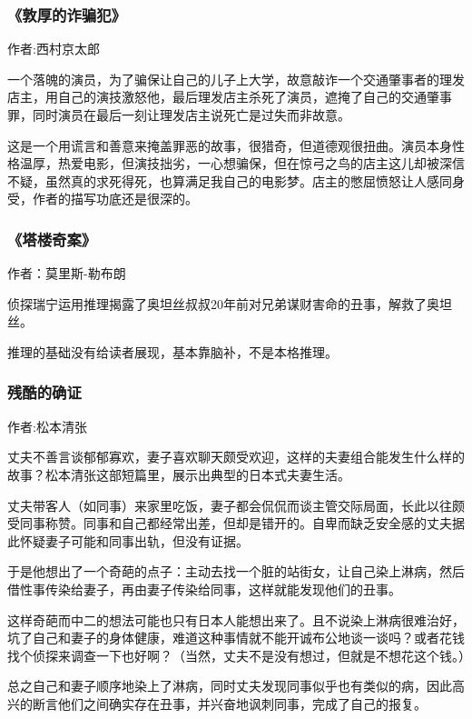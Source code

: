 \subsubsection{《敦厚的诈骗犯》}

作者:西村京太郎

一个落魄的演员，为了骗保让自己的儿子上大学，故意敲诈一个交通肇事者的理发店主，用自己的演技激怒他，最后理发店主杀死了演员，遮掩了自己的交通肇事罪，同时演员在最后一刻让理发店主说死亡是过失而非故意。

这是一个用谎言和善意来掩盖罪恶的故事，很猎奇，但道德观很扭曲。演员本身性格温厚，热爱电影，但演技拙劣，一心想骗保，但在惊弓之鸟的店主这儿却被深信不疑，虽然真的求死得死，也算满足我自己的电影梦。店主的憋屈愤怒让人感同身受，作者的描写功底还是很深的。

\subsubsection{《塔楼奇案》}

作者：莫里斯-勒布朗

侦探瑞宁运用推理揭露了奥坦丝叔叔20年前对兄弟谋财害命的丑事，解救了奥坦丝。

推理的基础没有给读者展现，基本靠脑补，不是本格推理。

\subsubsection{残酷的确证}

作者:松本清张

丈夫不善言谈郁郁寡欢，妻子喜欢聊天颇受欢迎，这样的夫妻组合能发生什么样的故事？松本清张这部短篇里，展示出典型的日本式夫妻生活。

丈夫带客人（如同事）来家里吃饭，妻子都会侃侃而谈主管交际局面，长此以往颇受同事称赞。同事和自己都经常出差，但却是错开的。自卑而缺乏安全感的丈夫据此怀疑妻子可能和同事出轨，但没有证据。

于是他想出了一个奇葩的点子：主动去找一个脏的站街女，让自己染上淋病，然后借性事传染给妻子，再由妻子传染给同事，这样就能发现他们的丑事。

这样奇葩而中二的想法可能也只有日本人能想出来了。且不说染上淋病很难治好，坑了自己和妻子的身体健康，难道这种事情就不能开诚布公地谈一谈吗？或者花钱找个侦探来调查一下也好啊？（当然，丈夫不是没有想过，但就是不想花这个钱。）

总之自己和妻子顺序地染上了淋病，同时丈夫发现同事似乎也有类似的病，因此高兴的断言他们之间确实存在丑事，并兴奋地讽刺同事，完成了自己的报复。


